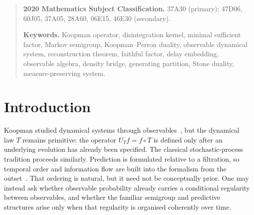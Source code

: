 \maketitle

\begin{abstract}
A $\sigma$-additive probability measure on an observable
algebra~\cite{mahon_paper1} already determines, via the Rokhlin
disintegration theorem, a disintegration kernel for any pair of
observables and a minimal sufficient factor carrying full conditional
information.  When the observables are indexed over time, temporal
coherence forces the Chapman--Kolmogorov equation; a Markov semigroup
and Koopman--Perron duality follow without a separately posited
dynamical law.  In a measure-preserving system the minimal sufficient
factor becomes the delay map, and reconstruction --- that the observable
$\sigma$-algebra equals the full $\sigma$-algebra modulo null sets, that
the delay algebra is dense in $L^2$, and that the delay map is a
measure-theoretic embedding --- reduces to the faithfulness of this
factor.  The Stone space built in~\cite{mahon_paper1} to realise
$\sigma$-additivity is then identified with the state space itself.
\end{abstract}

\begin{quote}\small
\textbf{2020 Mathematics Subject Classification.}
37A30 (primary); 47D06, 60J05, 37A05, 28A60, 06E15, 46E30 (secondary).

\textbf{Keywords.}
Koopman operator, disintegration kernel, minimal sufficient factor,
Markov semigroup, Koopman--Perron duality, observable dynamical system,
reconstruction theorem, faithful factor, delay embedding, observable algebra,
density bridge, generating partition, Stone duality, measure-preserving system.
\end{quote}

\section{Introduction}
\label{II:sec:intro}

Koopman studied dynamical systems through observables~\cite{Koopman1931}, but
the dynamical law $T$ remains primitive: the operator $U_T f = f \circ T$ is
defined only after an underlying evolution has already been specified.  The
classical stochastic-process tradition proceeds similarly.  Prediction is
formulated relative to a filtration, so temporal order and information flow are
built into the formalism from the outset~\cite{Doob1953}.  That ordering is
natural, but it need not be conceptually prior.  One may instead ask whether observable probability already carries a conditional
regularity between observables, and whether the familiar semigroup and predictive
structures arise only when that regularity is organised coherently over time.


